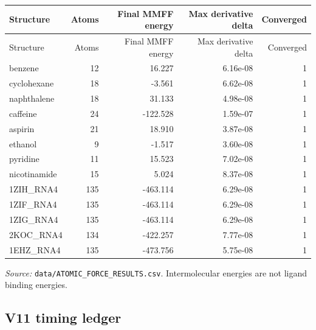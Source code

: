 \documentclass[11pt,a4paper]{article}
\begin{document}
\begin{center}\small\begin{longtable}{lrrrr}
\toprule
Structure & Atoms & Final MMFF energy & Max derivative delta & Converged\\
\midrule
\endfirsthead
\toprule
Structure & Atoms & Final MMFF energy & Max derivative delta & Converged\\
\midrule
\endhead
benzene & 12 & 16.227 & 6.16e-08 & 1\\
cyclohexane & 18 & -3.561 & 6.62e-08 & 1\\
naphthalene & 18 & 31.133 & 4.98e-08 & 1\\
caffeine & 24 & -122.528 & 1.59e-07 & 1\\
aspirin & 21 & 18.910 & 3.87e-08 & 1\\
ethanol & 9 & -1.517 & 3.60e-08 & 1\\
pyridine & 11 & 15.523 & 7.02e-08 & 1\\
nicotinamide & 15 & 5.024 & 8.37e-08 & 1\\
1ZIH\_RNA4 & 135 & -463.114 & 6.29e-08 & 1\\
1ZIF\_RNA4 & 135 & -463.114 & 6.29e-08 & 1\\
1ZIG\_RNA4 & 135 & -463.114 & 6.29e-08 & 1\\
2KOC\_RNA4 & 134 & -422.257 & 7.77e-08 & 1\\
1EHZ\_RNA4 & 135 & -473.756 & 5.75e-08 & 1\\
\bottomrule
\end{longtable}
\end{center}
\textit{Source: } \texttt{data/ATOMIC\_FORCE\_RESULTS.csv}. Intermolecular energies are not ligand binding energies.
\subsection{V11 timing ledger}
\end{document}

